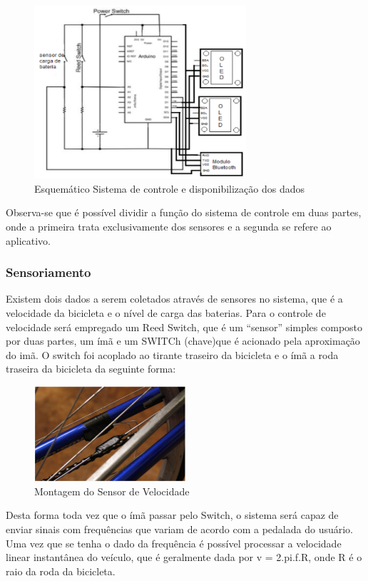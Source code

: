 			\graphicspath{{figuras/}}
			\begin{figure}[h!]
				\centering
				\includegraphics[width=0.7\textwidth]{Figura_7_sistema_de_controle.PNG}
				\caption{Esquemático Sistema de controle e disponibilização dos dados}
				\label{img:sistema_de_controle_e_disponibiização_de_dados}
			\end{figure}
			
		Observa-se que é possível dividir a função do sistema de controle em duas partes, onde a primeira trata exclusivamente dos sensores e a segunda se refere ao aplicativo.
	
		\subsubsection{Sensoriamento}
		Existem dois dados a serem coletados através de sensores no sistema, que é a velocidade da bicicleta e o nível de carga das baterias.
		Para o controle de velocidade será empregado um Reed Switch, que é um “sensor” simples composto por duas partes, um ímã e um SWITCh (chave)que é acionado pela aproximação do imã. O switch foi acoplado ao tirante traseiro da bicicleta e o ímã a roda traseira da bicicleta da seguinte forma:
			\graphicspath{{figuras/}}
			\begin{figure}[h!]
				\centering
				\includegraphics[width=0.5\textwidth]{Figura_8_montagem_do_sensor_velocidade.PNG}
				\caption{Montagem do Sensor de Velocidade}
				\label{img:montagem_do_sensor_velocidade}
			\end{figure}
		Desta forma toda vez que o ímã passar pelo Switch, o sistema será capaz de enviar sinais com frequências que variam de acordo com a pedalada do usuário. Uma vez que se tenha o dado da frequência é possível processar a velocidade linear instantânea do veículo, que é geralmente dada por v = 2.pi.f.R, onde R é o raio da roda da bicicleta.
		

